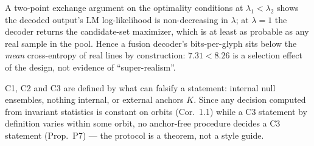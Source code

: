 
\begin{proofsketch}
A two-point exchange argument on the optimality conditions at
$\lambda_1<\lambda_2$ shows the decoded output's LM log-likelihood is
non-decreasing in $\lambda$; at $\lambda=1$ the decoder returns the
candidate-set maximizer, which is at least as probable as any real
sample in the pool. Hence a fusion decoder's bits-per-glyph sits
below the \emph{mean} cross-entropy of real lines by construction:
$7.31<8.26$ is a selection effect of the design, not evidence of
``super-realism''.
\end{proofsketch}

\begin{proofsketch}
C1, C2 and C3 are defined by what can falsify a statement: internal
null ensembles, nothing internal, or external anchors $K$. Since any
decision computed from invariant statistics is constant on orbits
(Cor.~1.1) while a C3 statement by definition varies within some
orbit, no anchor-free procedure decides a C3 statement
(Prop.~P7) --- the protocol is a theorem, not a style guide.
\end{proofsketch}

